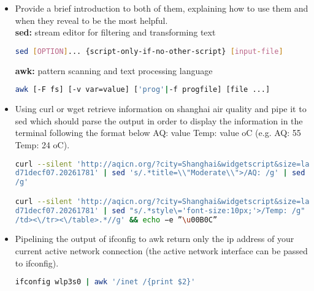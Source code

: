 \documentclass{article}
\begin{document}
\begin{itemize}
\item Provide a brief introduction to both of them, explaining how to use them and when they reveal to
be the most helpful.\\
\textbf{sed:} stream editor for filtering and transforming text
\begin{lstlisting}[language=bash]
sed [OPTION]... {script-only-if-no-other-script} [input-file]
\end{lstlisting}
\textbf{awk:} pattern scanning and text processing language
\begin{lstlisting}[language=bash]
awk [-F fs] [-v var=value] ['prog'|-f progfile] [file ...]
\end{lstlisting}
\item Using curl or wget retrieve information on shanghai air quality and pipe it to sed which should parse the output in order to display the information in the terminal following the format below AQ: value Temp: value oC (e.g. AQ: 55 Temp: 24 oC).\\
\begin{lstlisting}[language=bash]
curl --silent 'http://aqicn.org/?city=Shanghai&widgetscript&size=large&id=52b39
d71decf07.20261781' | sed 's/.*title=\\"Moderate\\">/AQ: /g' | sed 's/<\/div.*/
/g'

curl --silent 'http://aqicn.org/?city=Shanghai&widgetscript&size=large&id=52b39
d71decf07.20261781' | sed "s/.*style\='font-size:10px;'>/Temp: /g" | sed 's/<\
/td><\/tr><\/table>.*//g' && echo −e ”\u00B0C”
\end{lstlisting}
\item Pipelining the output of ifconfig to awk return only the ip address of your current active network connection (the active network interface can be passed to ifconfig).\\
\begin{lstlisting}[language=bash]
ifconfig wlp3s0 | awk '/inet /{print $2}'
\end{lstlisting}
\end{itemize}
\end{document}

